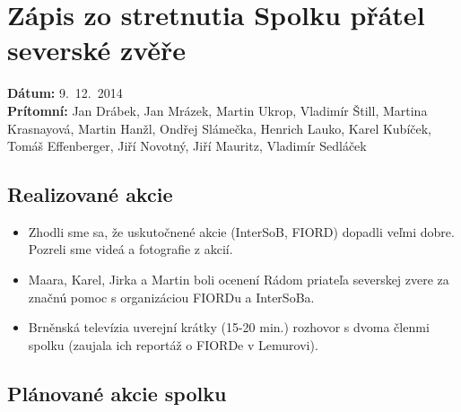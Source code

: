 \documentclass[11pt,a4paper]{article}
\begin{document}
\section*{Zápis zo stretnutia Spolku přátel severské zvěře}
\textbf{Dátum:} 9.\ 12.\ 2014\\
\textbf{Prítomní:} Jan Drábek, Jan Mrázek, Martin Ukrop, Vladimír Štill, Martina Krasnayová, Martin Hanžl, Ondřej Slámečka, Henrich Lauko, Karel Kubíček, Tomáš Effenberger, Jiří Novotný, Jiří Mauritz, Vladimír Sedláček

\subsection*{Realizované akcie}
\begin{itemize}[itemsep=0pt]
\item Zhodli sme sa, že uskutočnené akcie (InterSoB, FIORD) dopadli veľmi dobre. Pozreli sme videá a fotografie z akcií.
\item Maara, Karel, Jirka a Martin boli ocenení Rádom priateľa severskej zvere za značnú pomoc s organizáciou FIORDu a InterSoBa.
\item Brněnská televízia uverejní krátky (15-20 min.) rozhovor s dvoma členmi spolku (zaujala ich reportáž o FIORDe v Lemurovi).
\end{itemize}

\subsection*{Plánované akcie spolku}
\end{document}
